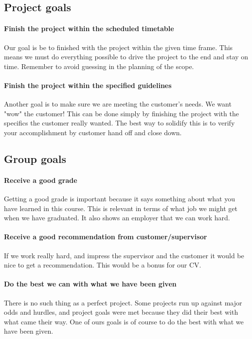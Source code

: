 \subsection{Project goals}

\paragraph{Finish the project within the scheduled timetable}
Our goal is be to finished with the project within the given time frame. This means we must do everything possible to drive the project to the end and stay on time. Remember to avoid guessing in the planning of the scope.

\paragraph{Finish the project within the specified guidelines}
Another goal is to make sure we are meeting the customer's needs. We want "wow" the customer! 
This can be done simply by finishing the project with the specifics the customer really wanted. The best way to solidify this is to verify your accomplishment by customer hand off and close down.

\subsection{Group goals}
\paragraph{Receive a good grade}
Getting a good grade is important because it says something about what you have learned in this course. 
This is relevant in terms of what job we might get when we have graduated. It also shows an employer that we can work hard. 
\paragraph{Receive a good recommendation from customer/supervisor}
If we work really hard, and impress the supervisor and the customer it would be nice to get a recommendation. This would be a bonus for our CV.


\paragraph{Do the best we can with what we have been given}
There is no such thing as a perfect project.
Some projects run up against major odds and hurdles, and project goals were met because they did their best with what came their way. One of ours goals is of course to do the best with what we have been given.


